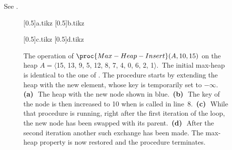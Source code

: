 See .
\begin{figure}[htb]
    \subcaptionbox{\label{fig:6.5-2a}}[0.5\textwidth]{{a.tikz}}
    \subcaptionbox{\label{fig:6.5-2b}}[0.5\textwidth]{{b.tikz}}
    \par\vspace{1.5\vertexsize}
    \subcaptionbox{\label{fig:6.5-2c}}[0.5\textwidth]{{c.tikz}}
    \subcaptionbox{\label{fig:6.5-2d}}[0.5\textwidth]{{d.tikz}}
    \caption{The operation of $\proc{Max-Heap-Insert}(A,10,15)$ on the heap $A=\langle$15, 13, 9, 5, 12, 8, 7, 4, 0, 6, 2, 1$\rangle$.\,
    The initial max-heap is identical to the one of .
    The procedure starts by extending the heap with the new element, whose key is temporarily set to $-\infty$.
    \textbf{(a)}\,~The heap with the new node shown in blue.\,
    \textbf{(b)}\,~The key of the node is then increased to 10 when  is called in line~8.\,
    \textbf{(c)}\,~While that procedure is running, right after the first iteration of the  loop, the new node has been swapped with its parent.\,
    \textbf{(d)}\,~After the second iteration another such exchange has been made.
    The max-heap property is now restored and the procedure terminates.} \label{fig:6.5-2}
\end{figure}
